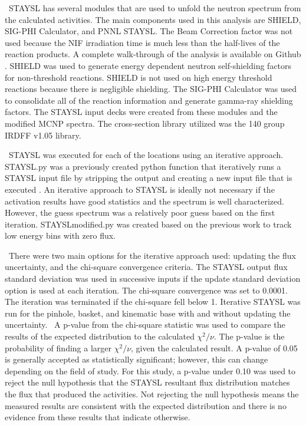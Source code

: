 \documentclass[journal]{IEEEtran}
\begin{document}
	\ STAYSL has several modules that are used to unfold the neutron spectrum from the calculated activities. The main components used in this analysis are SHIELD, SIG-PHI Calculator, and PNNL STAYSL. The Beam Correction factor was not used because the NIF irradiation time is much less than the half-lives of the reaction products. A complete walk-through of the analysis is available on Github \cite{Me}. SHIELD was used to generate energy dependent neutron self-shielding factors for non-threshold reactions. SHIELD is not used on high energy threshold reactions because there is negligible shielding. The SIG-PHI Calculator was used to consolidate all of the reaction information and generate gamma-ray shielding factors. The STAYSL input decks were created from these modules and the modified MCNP spectra. The cross-section library utilized was the 140 group IRDFF v1.05 library. 
	
	\ STAYSL was executed for each of the locations using an iterative approach. STAYSL.py was a previously created python function that iteratively runs a STAYSL input file by stripping the output and creating a new input file that is executed \cite{Iter}. An iterative approach to STAYSL is ideally not necessary if the activation results have good statistics and the spectrum is well characterized. However, the guess spectrum was a relatively poor guess based on the first iteration. STAYSLmodified.py was created based on the previous work to track low energy bins with zero flux. 
	
	\ There were two main options for the iterative approach used: updating the flux uncertainty, and the chi-square convergence criteria. The STAYSL output flux standard deviation was used in successive inputs if the update standard deviation option is used at each iteration. The chi-square convergence was set to 0.0001. The iteration was terminated if the chi-square fell below 1. Iterative STAYSL was run for the pinhole, basket, and kinematic base with and without updating the uncertainty. 
	\ A p-value from the chi-square statistic was used to compare the results of the expected distribution to the calculated $\chi^{2}/\nu$. 
	The p-value is the probability of finding a larger $\chi^{2}/\nu$, given the calculated result. 
	A p-value of 0.05 is generally accepted as statistically significant; however, this can change depending on the field of study. For this study, a p-value under 0.10 was used to reject the null hypothesis that the STAYSL resultant flux distribution matches the flux that produced the activities. Not rejecting the null hypothesis means the measured results are consistent with the expected distribution and there is no evidence from these results that indicate otherwise. 
\end{document}
